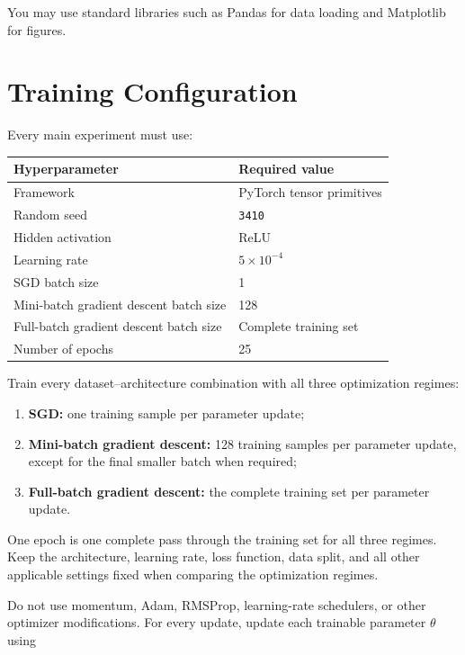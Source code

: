 \documentclass[11pt,a4paper]{article}
\newcommand{\code}[1]{\texttt{#1}}
\begin{document}
You may use standard libraries such as Pandas for data loading and Matplotlib for figures.

\section{Training Configuration}

Every main experiment must use:

\begin{center}
\begin{tabular}{ll}
\toprule
\textbf{Hyperparameter} & \textbf{Required value} \\
\midrule
Framework & PyTorch tensor primitives \\
Random seed & \code{3410} \\
Hidden activation & ReLU \\
Learning rate & $5\times10^{-4}$ \\
SGD batch size & 1 \\
Mini-batch gradient descent batch size & 128 \\
Full-batch gradient descent batch size & Complete training set \\
Number of epochs & 25 \\
\bottomrule
\end{tabular}
\end{center}

Train every dataset--architecture combination with all three optimization regimes:

\begin{enumerate}
    \item \textbf{SGD:} one training sample per parameter update;
    \item \textbf{Mini-batch gradient descent:} 128 training samples per parameter update, except for the final smaller batch when required;
    \item \textbf{Full-batch gradient descent:} the complete training set per parameter update.
\end{enumerate}

One epoch is one complete pass through the training set for all three regimes. Keep the architecture, learning rate, loss function, data split, and all other applicable settings fixed when comparing the optimization regimes.

Do not use momentum, Adam, RMSProp, learning-rate schedulers, or other optimizer modifications. For every update, update each trainable parameter $\theta$ using
\end{document}
